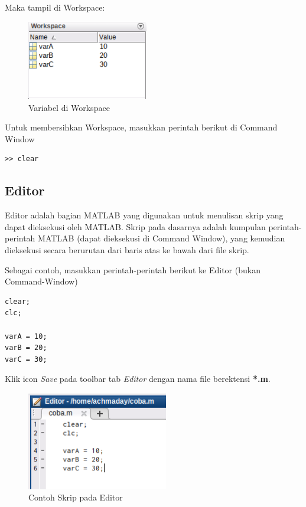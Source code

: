 \documentclass[12pt]{book}
\begin{document}
	\newpage
	Maka tampil di Workspace:
	
	\begin{figure}[!ht]
		\centering
		\includegraphics[width=150pt]{images/workspace}
		\caption{Variabel di Workspace}
	\end{figure}

	Untuk membersihkan Workspace, masukkan perintah berikut di Command Window
	\begin{verbatim}
>> clear
	\end{verbatim}
		
	\subsection{Editor}
	Editor adalah bagian MATLAB yang digunakan untuk menulisan skrip yang dapat dieksekusi oleh MATLAB.
	Skrip pada dasarnya adalah kumpulan perintah-perintah MATLAB (dapat dieksekusi di Command Window),
	yang kemudian dieksekusi secara berurutan dari baris atas ke bawah dari file skrip.
	
	Sebagai contoh, masukkan perintah-perintah berikut ke Editor (bukan Command-Window)
	\begin{verbatim}
clear;
clc;

varA = 10;
varB = 20;
varC = 30;
	\end{verbatim}

	Klik icon \textit{Save} pada toolbar tab \textit{Editor} dengan nama file berektensi \textbf{*.m}.
	
	\begin{figure}[!ht]
		\centering
		\includegraphics[width=175pt]{images/editorcoba}
		\caption{Contoh Skrip pada Editor}
	\end{figure}
	
\end{document}
